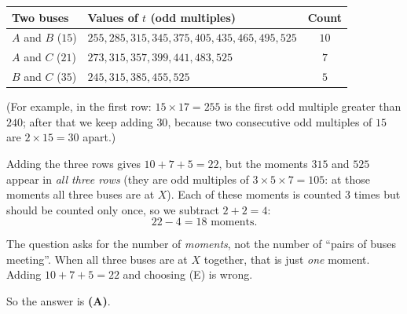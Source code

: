 {
\begin{center}\begin{tabular}{|l|l|c|}\hline
Two buses & Values of $t$ (odd multiples) & Count\\\hline
$A$ and $B$ ($15$) & $255, 285, 315, 345, 375, 405, 435, 465, 495, 525$ & $10$\\\hline
$A$ and $C$ ($21$) & $273, 315, 357, 399, 441, 483, 525$ & $7$\\\hline
$B$ and $C$ ($35$) & $245, 315, 385, 455, 525$ & $5$\\\hline
\end{tabular}\end{center}
(For example, in the first row: $15\times17=255$ is the first odd multiple greater than $240$; after that we keep adding $30$, because
two consecutive odd multiples of $15$ are $2\times15=30$ apart.)

Adding the three rows gives $10+7+5=22$, but the moments $315$ and $525$ appear in \emph{all three rows}
(they are odd multiples of $3\times5\times7=105$: at those moments all three buses are at $X$). Each of these moments is counted $3$ times
but should be counted only once, so we subtract $2+2=4$:
\[22-4=18 \text{ moments.}\]
\begin{warnbox}The question asks for the number of \emph{moments}, not the number of ``pairs of buses meeting''. When all three buses are at
$X$ together, that is just \emph{one} moment. Adding $10+7+5=22$ and choosing (E) is wrong.\end{warnbox}
So the answer is \textbf{(A)}.
}


